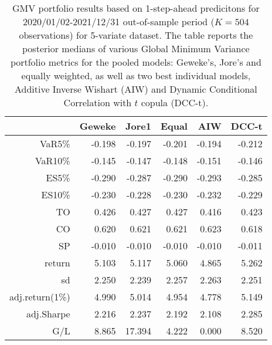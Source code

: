 \begin{table}[ht]
\centering
\caption{GMV portfolio results based on 1-step-ahead predicitons 
             for  2020/01/02-2021/12/31 out-of-sample period 
             ($K=504$ observations) for 5-variate dataset.
             The table reports the posterior medians of various Global Minimum
             Variance portfolio metrics for the pooled models: 
             Geweke's, Jore's and equally weighted, 
             as well as two best individual models, Additive Inverse Wishart (AIW) and 
             Dynamic Conditional Correlation with $t$ copula (DCC-t).} 
\label{table:gmvfull5_EX}
\begin{tabular}{rrrrrr}
  \hline
 & Geweke & Jore1 & Equal & AIW & DCC-t \\ 
  \hline
VaR5\% & -0.198 & -0.197 & -0.201 & -0.194 & -0.212 \\ 
  VaR10\% & -0.145 & -0.147 & -0.148 & -0.151 & -0.146 \\ 
  ES5\% & -0.290 & -0.287 & -0.290 & -0.293 & -0.285 \\ 
  ES10\% & -0.230 & -0.228 & -0.230 & -0.232 & -0.229 \\ 
  TO & 0.426 & 0.427 & 0.427 & 0.416 & 0.423 \\ 
  CO & 0.620 & 0.621 & 0.621 & 0.623 & 0.618 \\ 
  SP & -0.010 & -0.010 & -0.010 & -0.010 & -0.011 \\ 
   \hline
return & 5.103 & 5.117 & 5.060 & 4.865 & 5.262 \\ 
  sd & 2.250 & 2.239 & 2.257 & 2.263 & 2.251 \\ 
  adj.return(1\%) & 4.990 & 5.014 & 4.954 & 4.778 & 5.149 \\ 
  adj.Sharpe & 2.216 & 2.237 & 2.192 & 2.108 & 2.285 \\ 
  G/L & 8.865 & 17.394 & 4.222 & 0.000 & 8.520 \\ 
   \hline
\end{tabular}
\end{table}
